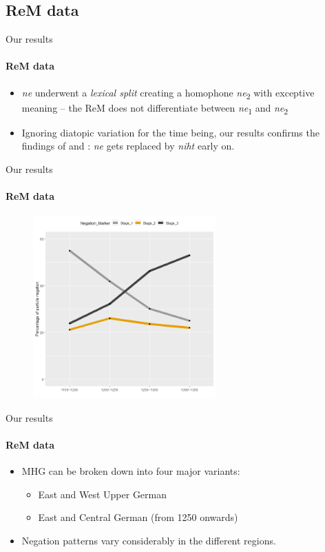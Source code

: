 \documentclass[xcolor=table, compress, %
handout
]{beamer}
\begin{document}
\subsection{ReM data}


\begin{frame}{Our results}
\framesubtitle{ReM data}
    
    \begin{itemize}
        \item \textit{ne} underwent a \textit{lexical split} creating a homophone \textit{ne}\textsubscript{2} with exceptive meaning – the ReM does not differentiate between \textit{ne}\textsubscript{1} and \textit{ne}\textsubscript{2}
        \item Ignoring diatopic variation for the time being, our results confirms the findings of \citet{jaeger08} and \citet{Pickl2017}: \textit{ne} gets replaced by \textit{niht} early on.
    \end{itemize}
    
\end{frame}


\begin{frame}{Our results}
\framesubtitle{ReM data}
    
    \begin{figure}[h]
\centering
\includegraphics[width=7cm]{Diachron.png}
\end{figure}
    
\end{frame}


\begin{frame}{Our results}
\framesubtitle{ReM data}

\begin{itemize}
\item MHG can be broken down into four major variants: 
\begin{itemize}
\item East and West Upper German
\item East and Central German (from 1250 onwards)
\end{itemize}
\item Negation patterns vary considerably in the different regions.
\end{itemize}

\end{frame}
\end{document}
